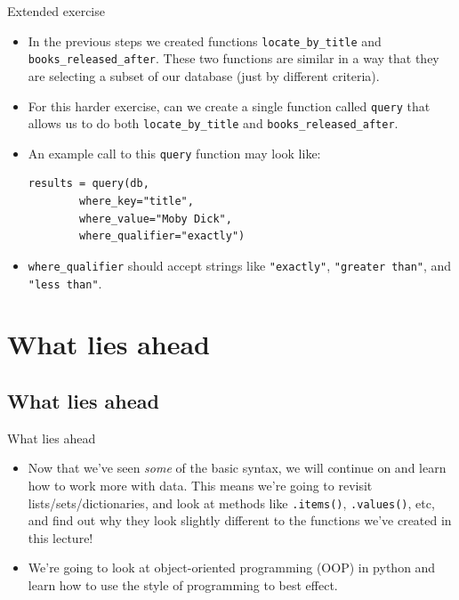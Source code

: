 \documentclass[10pt]{beamer}
\begin{document}
\begin{frame}[label={sec:org0610ee5},fragile]{Extended exercise}
 \begin{itemize}
\item In the previous steps we created functions \texttt{locate\_by\_title} and
\texttt{books\_released\_after}. These two functions are similar in a way that they are
selecting a subset of our database (just by different criteria).
\item For this harder exercise, can we create a single function called \texttt{query} that allows
us to do both \texttt{locate\_by\_title} and \texttt{books\_released\_after}.
\item An example call to this \texttt{query} function may look like:

\begin{verbatim}
results = query(db,
		where_key="title",
		where_value="Moby Dick",
		where_qualifier="exactly")
\end{verbatim}

\item \texttt{where\_qualifier} should accept strings like \texttt{"exactly"}, \texttt{"greater than"}, and \texttt{"less
  than"}.
\end{itemize}
\end{frame}

\section{What lies ahead}
\label{sec:orge9ea221}

\subsection{What lies ahead}
\label{sec:org60989bf}

\begin{frame}[label={sec:org6412f93},fragile]{What lies ahead}
 \begin{itemize}
\item Now that we've seen \emph{some} of the basic syntax, we will continue on and learn how to
work more with data. This means we're going to revisit lists/sets/dictionaries, and
look at methods like \texttt{.items()}, \texttt{.values()}, etc, and find out why they look slightly
different to the functions we've created in this lecture!
\item We're going to look at object-oriented programming (OOP) in python and learn how to
use the style of programming to best effect.
\end{itemize}
\end{frame}
\end{document}
